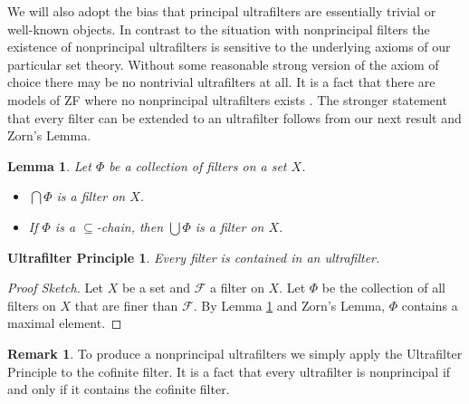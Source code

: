 \documentclass[12pt]{article}
\theoremstyle{plain}
\newtheorem{lem}[thm]{Lemma}
\newtheorem{up}[thm]{Ultrafilter Principle}
\theoremstyle{definition}
\newtheorem{rmk}[thm]{Remark}
\newcommand{\calF}{\mathcal{F}}
\begin{document}
We will also adopt the bias that principal ultrafilters are essentially trivial or well-known objects.
In contrast to the situation with nonprincipal filters the existence of nonprincipal ultrafilters is sensitive to the underlying axioms of our particular set theory.
Without some reasonable strong version of the axiom of choice there may be no nontrivial ultrafilters at all.
It is a fact that there are models of ZF where no nonprincipal ultrafilters exists \cite{Blass:1977fk}.
The stronger statement that every filter can be extended to an ultrafilter follows from our next result and Zorn's Lemma.%

\begin{lem}
  \label{lem:chainFlt}
  Let $\Phi$ be a collection of filters on a set $X$.
  \begin{itemize}
    \item[(a)] $\bigcap\Phi$ is a filter on $X$.

    \item[(b)] If $\Phi$ is a \mbox{$\subseteq$-chain}, then $\bigcup\Phi$ is a filter on $X$.
  \end{itemize}
\end{lem}

\begin{up}
  Every filter is contained in an ultrafilter.
\end{up}
\begin{proof}[Proof Sketch]
  Let $X$ be a set and $\calF$ a filter on $X$.
  Let $\Phi$ be the collection of all filters on $X$ that are finer than $\calF$.
  By Lemma \ref{lem:chainFlt} and Zorn's Lemma, $\Phi$ contains a maximal element.
\end{proof}
\begin{rmk}
  To produce a nonprincipal ultrafilters we simply apply the Ultrafilter Principle to the cofinite filter.
  It is a fact that every ultrafilter is nonprincipal if and only if it contains the cofinite filter.
\end{rmk}
\end{document}
